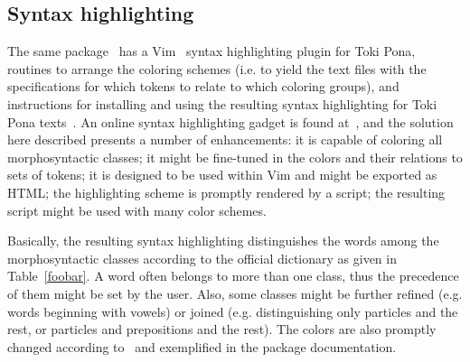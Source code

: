 \documentclass{article}
\begin{document}


\subsection{Syntax highlighting}\label{shigh}
The same package~\cite{tokipona}
has a Vim~\cite{vim} syntax highlighting plugin
for Toki Pona,
routines to arrange the coloring schemes
(i.e. to yield the text files with the specifications for which tokens
to relate to which coloring groups),
and instructions for installing and using
the resulting syntax highlighting for Toki Pona texts~\cite{tokipona}.
An online syntax highlighting gadget is found at~\cite{tpNetSH},
and the solution here described presents a number of enhancements:
it is capable of coloring all morphosyntactic classes;
it might be fine-tuned in the colors and their relations to sets of
tokens; it is designed to be used within Vim
and might be exported as HTML; the highlighting scheme is promptly
rendered by a script; the resulting script might be used with
many color schemes.

Basically, the resulting syntax highlighting
distinguishes the words among the morphosyntactic
classes according to the official dictionary as given in
Table~\ref{foobar}.
A word often belongs to more than one class,
thus the precedence of them might be set by the user.
Also, some classes might be further refined (e.g. words beginning with
vowels) or joined (e.g. distinguishing only particles and the rest,
or particles and prepositions and the rest).
The colors are also promptly changed according to~\cite{vim}
and exemplified in the package documentation.
\end{document}
